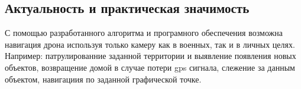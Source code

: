     \subsection*{Актуальность и практическая значимость}
    
    \tab С помощью разработанного алгоритма и програмного обеспечения возможна навигация дрона используя только камеру как в военных, так и в личных целях. Например: патрулированние заданной территории и выявление появления новых объектов, возвращение домой в случае потери gps сигнала, слежение за данным объектом, навигациия по заданной графической точке.
\newpage